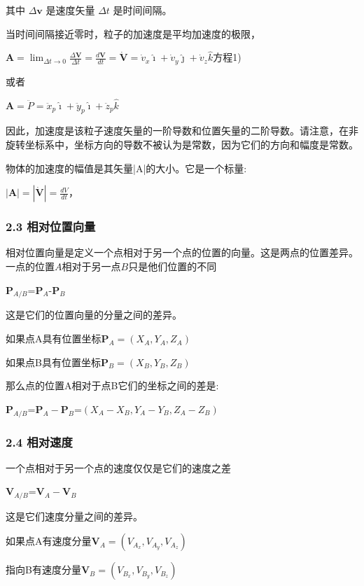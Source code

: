 其中 $\Delta \mathbf{v}$ 是速度矢量 $\Delta t$ 是时间间隔。

当时间间隔接近零时，粒子的加速度是平均加速度的极限，

$\mathbf {A} = \lim_{\Delta t \to 0} \frac{\Delta \mathbf{V}}{\Delta t} = \frac{d \mathbf{V}}{dt} = \dot{\mathbf{V}} = \dot{v}_x\hat{\imath} + \dot{v}_y\hat{\jmath} + \dot{v}_z\hat{k}$方程1)

或者

$\mathbf{A}=\ddot{P}=\ddot{x}_p\hat{\imath}+\ddot{y}_p\hat{\imath}+\ddot{z}_p\hat{k}$

因此，加速度是该粒子速度矢量的一阶导数和位置矢量的二阶导数。请注意，在非旋转坐标系中，坐标方向的导数不被认为是常数，因为它们的方向和幅度是常数。

物体的加速度的幅值是其矢量|A|的大小。它是一个标量:

$\left| \mathbf{A} \right| = \left| \dot{\mathbf{V}} \right| = \frac{dV}{dt}$，

\subsubsection{2.3 相对位置向量}

相对位置向量是定义一个点相对于另一个点的位置的向量。这是两点的位置差异。 一点的位置$A$相对于另一点$B$只是他们位置的不同

$\mathbf{P}_{A/B}$=$\mathbf{P}_{A}$-$\mathbf{P}_{B}$

这是它们的位置向量的分量之间的差异。

如果点A具有位置坐标$\mathbf{P}_{A}=(X_{A},Y_{A},Z_{A})$

如果点B具有位置坐标$\mathbf{P}_{B}=(X_{B},Y_{B},Z_{B})$

那么点的位置A相对于点B它们的坐标之间的差是:

$\mathbf{P}_{A/B}$=$\mathbf{P}_{A}-\mathbf{P}_{B}$=$(X_{A}-X_{B},Y_{A}-Y_{B},Z_{A}-Z_{B})$

\subsubsection{2.4 相对速度}

一个点相对于另一个点的速度仅仅是它们的速度之差

$\mathbf{V}_{A/B}$=$\mathbf{V}_{A}-\mathbf{V}_{B}$

这是它们速度分量之间的差异。

如果点A有速度分量$\mathbf{V}_{A}=(V_{A_x},V_{A_y},V_{A_z})$

指向B有速度分量$\mathbf{V}_{B}=(V_{B_x},V_{B_y},V_{B_z})$

